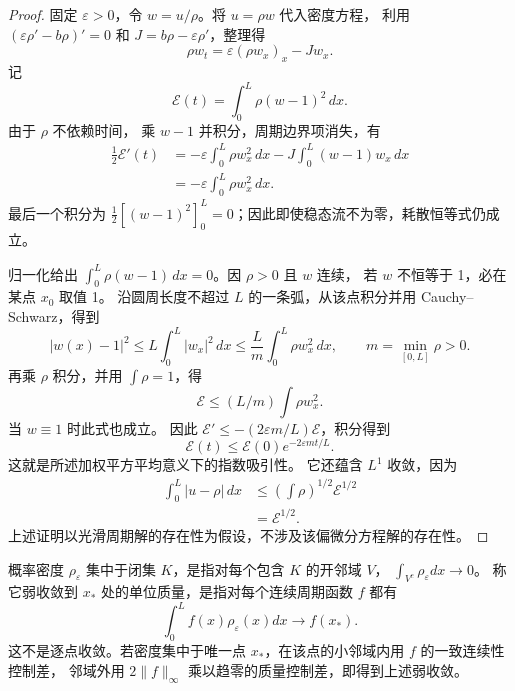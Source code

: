 \begin{proof}
固定 $\varepsilon>0$，令 $w=u/\rho$。将 $u=\rho w$ 代入密度方程，
利用 $(\varepsilon\rho'-b\rho)'=0$ 和 $J=b\rho-\varepsilon\rho'$，整理得
\[
 \rho w_t=\varepsilon(\rho w_x)_x-Jw_x.
\]
记 
\[
 \mathcal E(t)=\displaystyle\int_0^L\rho(w-1)^2\,dx.
\]
由于 $\rho$ 不依赖时间，
乘 $w-1$ 并积分，周期边界项消失，有
\begin{align*}
 \tfrac12\mathcal E'(t)
 &=-\varepsilon\int_0^L\rho w_x^2\,dx
   -J\int_0^L(w-1)w_x\,dx\\
 &=-\varepsilon\int_0^L\rho w_x^2\,dx.
\end{align*}
最后一个积分为 $\tfrac12[(w-1)^2]_0^L=0$；因此即使稳态流不为零，耗散恒等式仍成立。

归一化给出 $\displaystyle\int_0^L\rho(w-1)\,dx=0$。因 $\rho>0$ 且 $w$ 连续，
若 $w$ 不恒等于 1，必在某点 $x_0$ 取值 1。
沿圆周长度不超过 $L$ 的一条弧，从该点积分并用 Cauchy--Schwarz，得到
\[
 |w(x)-1|^2\leq L\int_0^L|w_x|^2\,dx
 \leq\frac{L}{m}\int_0^L\rho w_x^2\,dx,
 \qquad m=\min_{[0,L]}\rho>0.
\]
再乘 $\rho$ 积分，并用 $\displaystyle\int\rho=1$，得
\[
 \mathcal E\leq(L/m)\displaystyle\int\rho w_x^2.
\]
当 $w\equiv1$ 时此式也成立。
因此 $\mathcal E'\leq-(2\varepsilon m/L)\mathcal E$，积分得到
\[
 \mathcal E(t)\leq\mathcal E(0)e^{-2\varepsilon mt/L}.
\]
这就是所述加权平方平均意义下的指数吸引性。
它还蕴含 $L^1$ 收敛，因为
\[
 \begin{aligned}
 \int_0^L|u-\rho|\,dx
 &\leq\left(\int\rho\right)^{1/2}\mathcal E^{1/2}\\
 &=\mathcal E^{1/2}.
\end{aligned}
\]
上述证明以光滑周期解的存在性为假设，不涉及该偏微分方程解的存在性。
\end{proof}

\begin{definition}[密度的集中与弱收敛]\label{def:density-concentration}
概率密度 $\rho_\varepsilon$ 集中于闭集 $K$，是指对每个包含 $K$ 的开邻域 $V$，
$\displaystyle\int_{V^c}\rho_\varepsilon dx\to0$。
称它弱收敛到 $x_*$ 处的单位质量，是指对每个连续周期函数 $f$ 都有
\[
 \int_0^Lf(x)\rho_\varepsilon(x)dx\longrightarrow f(x_*).
\]
这不是逐点收敛。若密度集中于唯一点 $x_*$，在该点的小邻域内用 $f$ 的一致连续性控制差，
邻域外用 $2\|f\|_\infty$ 乘以趋零的质量控制差，即得到上述弱收敛。

\end{definition}

